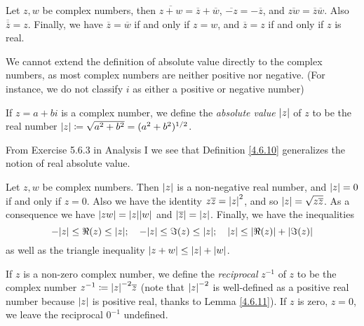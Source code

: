 \begin{lemma}\label{4.6.9}
    Let \(z, w\) be complex numbers, then \(\overline{z + w} = \overline{z} + \overline{w}\), \(\overline{-z} = -\overline{z}\), and \(\overline{zw} = \overline{z} \overline{w}\).
    Also \(\overline{\overline{z}} = z\).
    Finally, we have \(\overline{z} = \overline{w}\) if and only if \(z = w\), and \(\overline{z} = z\) if and only if \(z\) is real.
\end{lemma}

\begin{note}
    We cannot extend the definition of absolute value directly to the complex numbers, as most complex numbers are neither positive nor negative.
    (For instance, we do not classify \(i\) as either a positive or negative number)
\end{note}

\begin{definition}\label{4.6.10}
    If \(z = a + bi\) is a complex number, we define the \emph{absolute value} \(\abs*{z}\) of \(z\) to be the real number \(\abs*{z} \coloneqq \sqrt{a^2 + b^2} = (a^2 + b^2)^{1 / 2}\).
\end{definition}

\begin{note}
    From Exercise 5.6.3 in Analysis I we see that Definition \ref{4.6.10} generalizes the notion of real absolute value.
\end{note}

\begin{lemma}\label{4.6.11}
    Let \(z, w\) be complex numbers.
    Then \(\abs*{z}\) is a non-negative real number, and \(\abs*{z} = 0\) if and only if \(z = 0\).
    Also we have the identity \(z \overline{z} = \abs*{z}^2\), and so \(\abs*{z} = \sqrt{z \overline{z}}\).
    As a consequence we have \(\abs*{zw} = \abs*{z} \abs*{w}\) and \(\abs*{\overline{z}} = \abs*{z}\).
    Finally, we have the inequalities
    \[
        -\abs*{z} \leq \Re(z) \leq \abs*{z}; \quad -\abs*{z} \leq \Im(z) \leq \abs*{z}; \quad \abs*{z} \leq \abs*{\Re(z)} + \abs*{\Im(z)}
    \]
    as well as the triangle inequality \(\abs*{z + w} \leq \abs*{z} + \abs*{w}\).
\end{lemma}

\begin{definition}\label{4.6.12}
    If \(z\) is a non-zero complex number, we define the \emph{reciprocal} \(z^{-1}\) of \(z\) to be the complex number \(z^{-1} \coloneqq \abs*{z}^{-2} \overline{z}\)
    (note that \(\abs*{z}^{-2}\) is well-defined as a positive real number because \(\abs*{z}\) is positive real, thanks to Lemma \ref{4.6.11}).
    If \(z\) is zero, \(z = 0\), we leave the reciprocal \(0^{-1}\) undefined.
\end{definition}


